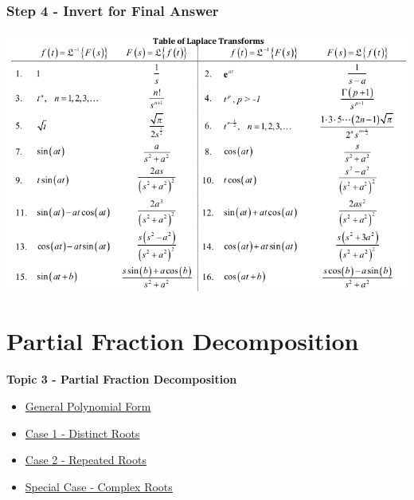 \documentclass[fleqn]{beamer} %
\newcommand{\sectionIIItitle}{Partial Fraction Decomposition}
\newcommand{\sectionIIsubsectionIVtitle}{Step 4 - Invert for Final Answer}
\newcommand{\sectionIIIsubsectionItitle}{General Polynomial Form}
\newcommand{\sectionIIIsubsectionIItitle}{Case 1 - Distinct Roots}
\newcommand{\sectionIIIsubsectionIIItitle}{Case 2 - Repeated Roots}
\newcommand{\sectionIIIsubsectionIVtitle}{Special Case - Complex Roots}
\begin{document}
			\begin{frame}
				\frametitle{\sectionIIsubsectionIVtitle}
				\bigskip
				
				\includegraphics[scale=.35]{images/laplace_table_part1.png}

				\btVFill 
			\end{frame}	


		
	\section{\sectionIIItitle}\label{sectionIII}

		\begin{frame}
			\large \textbf{Topic 3 - \sectionIIItitle} \vspace{3mm}\\

			\begin{itemize}
				\item \hyperlink{sectionIIIsubsectionI}{\sectionIIIsubsectionItitle} \vspc %
				\item \hyperlink{sectionIIIsubsectionII}{\sectionIIIsubsectionIItitle} \vspc %
				\item \hyperlink{sectionIIIsubsectionIII}{\sectionIIIsubsectionIIItitle} \vspc %
				\item \hyperlink{sectionIIIsubsectionIV}{\sectionIIIsubsectionIVtitle} \vspc %
			\end{itemize}

		\end{frame}
\end{document}

